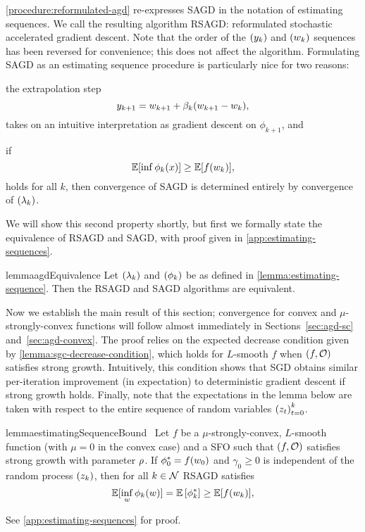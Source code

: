 \autoref{procedure:reformulated-agd} re-expresses \ac{SAGD} in the notation of estimating sequences.
We call the resulting algorithm \acs{RSAGD}: reformulated stochastic accelerated gradient descent.
Note that the order of the \( \seq{\yk} \) and \( \seq{\wk} \) sequences has been reversed for convenience; this does not affect the algorithm.
Formulating \ac{SAGD} as an estimating sequence procedure is particularly nice for two reasons:
\begin{inparaenum}[(1)]
\item the extrapolation step \[ \ykk = \wkk + \beta_k (\wkk - \wk), \] takes on an intuitive interpretation as gradient descent on \( \phi_{k+1} \), and 
\item if \[  \E [\inf \phi_k(x)] \geq \E [f(\wk)], \] holds for all \( k \), then convergence of \ac{SAGD} is determined entirely by convergence of \( \seq{\lambda_k} \).
\end{inparaenum}
We will show this second property shortly, but first we formally state the equivalence of \ac{RSAGD} and \ac{SAGD}, with proof given in \autoref{app:estimating-sequences}.

\begin{restatable}{lemma}{agdEquivalence}\label{lemma:agdEquivalence}
    Let \( \seq{\lambda_k} \) and \( \seq{\phi_k} \) be as defined in \autoref{lemma:estimating-sequence}.
    Then the \ac{RSAGD} and \ac{SAGD} algorithms are equivalent.
\end{restatable}

Now we establish the main result of this section; convergence for convex and \( \mu \)-strongly-convex functions will follow almost immediately in Sections~\ref{sec:agd-sc} and~\ref{sec:agd-convex}.
The proof relies on the expected decrease condition given by \autoref{lemma:sgc-decrease-condition}, which holds for \( L \)-smooth \( f \) when \( \rbr{f, \oracle{}} \) satisfies strong growth.
Intuitively, this condition shows that \ac{SGD} obtains similar per-iteration improvement (in expectation) to deterministic gradient descent if strong growth holds. 
Finally, note that the expectations in the lemma below are taken with respect to the entire sequence of random variables \( \seq{\z_t}_{t=0}^k \).

\begin{restatable}{lemma}{estimatingSequenceBound}~\label{lemma:estimating-sequence-bound}
    Let \( f \) be a \( \mu \)-strongly-convex, \( L \)-smooth function (with \( \mu = 0 \) in the convex case) and \oracle{} a \ac{SFO} such that \( \rbr{f, \oracle{}} \) satisfies strong growth with parameter \( \sgc \).
    If \( \phi_0^* = f(\w_0) \) and \( \gamma_0 \geq 0 \) is independent of the random process \( \seq{\zk} \), then for all \( k \in \calN \) \ac{RSAGD} satisfies 
    \[ \E [\inf_{w} \phi_k(\w)] = \E \sbr{\phi_k^*} \geq \E [f(\wk)], \]
\end{restatable}
\noindent See \autoref{app:estimating-sequences} for proof.

